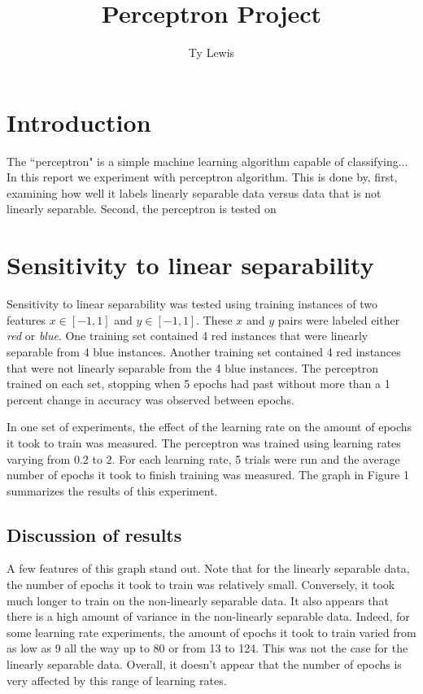 \documentclass[12pt,letterpaper]{article}
\title{Perceptron Project}
\author{Ty Lewis}
\begin{document}
 
\maketitle
\section*{Introduction}
The ``perceptron" is a simple machine learning algorithm capable of classifying... In this report we experiment with perceptron algorithm. This is done by, first, examining how well it labels linearly separable data versus data that is not linearly separable. Second, the perceptron is tested on 

\section*{Sensitivity to linear separability}

Sensitivity to linear separability was tested using training instances of two features $x \in [-1, 1]$ and $y \in [-1, 1]$. These $x$ and $y$ pairs were labeled either \emph{red} or \emph{blue}. One training set contained 4 red instances that were linearly separable from 4 blue instances. Another training set contained 4 red instances that were not linearly separable from the 4 blue instances. The perceptron trained on each set, stopping when 5 epochs had past without more than a 1 percent change in accuracy was observed between epochs.

In one set of experiments, the effect of the learning rate on the amount of epochs it took to train was measured. The perceptron was trained using learning rates varying from $0.2$ to $2$. For each learning rate, 5 trials were run and the average number of epochs it took to finish training was measured. The graph in Figure 1 summarizes the results of this experiment.

\subsection*{Discussion of results}

A few features of this graph stand out. Note that for the linearly separable data, the number of epochs it took to train was relatively small. Conversely, it took much longer to train on the non-linearly separable data. It also appears that there is a high amount of variance in the non-linearly separable data. Indeed, for some learning rate experiments, the amount of epochs it took to train varied from as low as 9 all the way up to 80 or from 13 to 124. This was not the case for the linearly separable data. Overall, it doesn't appear that the number of epochs is very affected by this range of learning rates.
\end{document}

